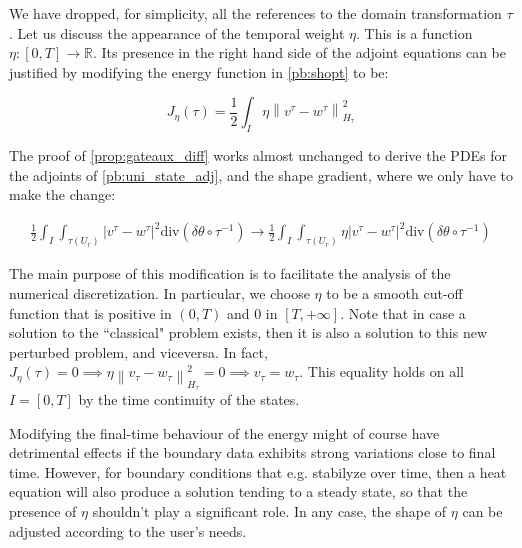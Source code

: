 \documentclass[english,a4paper,9pt,oneside]{scrbook}	%
\theoremstyle{break}
\theoremstyle{remark}
\newcommand{\mR}{\mathbb{R}}
\newcommand{\norm}[1]{\left\lVert#1\right\rVert}
\newcommand{\te}{\theta}
\newcommand{\dive}{\text{div}}
\begin{document}
We have dropped, for simplicity, all the references to the domain transformation $\tau$. Let us discuss the appearance of the temporal weight $\eta$. This is a function $\eta: [0,T] \rightarrow \mR$.
Its presence in the right hand side of the adjoint equations can be justified by modifying the energy function in \cref{pb:shopt} to be:

$$J_\eta(\tau) = \frac{1}{2} \int_I \eta \norm{v^\tau - w^\tau}_{H_\tau}^2$$

The proof of \cref{prop:gateaux_diff} works almost unchanged to derive the PDEs for the adjoints of \cref{pb:uni_state_adj}, and the shape gradient, where we only have to make the change:

\begin{align*}
\frac{1}{2}\int_I\int_{\tau(U_r)}|v^\tau-w^\tau|^2\dive(\delta \te\circ  \tau^{-1}) \rightarrow \frac{1}{2}\int_I\int_{\tau(U_r)}\eta|v^\tau-w^\tau|^2\dive(\delta \te\circ  \tau^{-1})
\end{align*} 



The main purpose of this modification is to facilitate the analysis of the numerical discretization. In particular, we choose $\eta$ to be a smooth cut-off function that is positive in $(0,T)$ and $0$ in $[T, +\infty]$. Note that in case a solution to the ``classical" problem exists, then it is also a solution to this new  perturbed problem, and viceversa. In fact, $J_\eta(\tau)=0 \implies \eta \norm{v_\tau - w_\tau}_{H_\tau}^2=0 \implies v_\tau = w_\tau$. This equality holds on all $I=[0,T]$ by the time continuity of the states.

Modifying the final-time behaviour of the energy might of course have detrimental effects if the boundary data exhibits strong variations close to final time. However, for boundary conditions that e.g. stabilyze over time, then a heat equation will also produce a solution tending to a steady state, so that the presence of $\eta$ shouldn't play a significant role. In any case, the shape of $\eta$ can be adjusted according to the user's needs.
\end{document}
